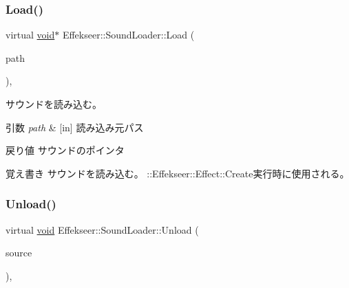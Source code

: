 \subsubsection{\texorpdfstring{Load()}{Load()}}
{\footnotesize\ttfamily virtual \mbox{\hyperlink{namespace_effekseer_ab34c4088e512200cf4c2716f168deb56}{void}}$\ast$ Effekseer\+::\+Sound\+Loader\+::\+Load (\begin{DoxyParamCaption}\item[{const \mbox{\hyperlink{_effekseer_8h_a50b026abea014b47854bcd835b3b6233}{E\+F\+K\+\_\+\+C\+H\+AR}} $\ast$}]{path }\end{DoxyParamCaption})\hspace{0.3cm}{\ttfamily [inline]}, {\ttfamily [virtual]}}



サウンドを読み込む。 


\begin{DoxyParams}{引数}
{\em path} & \mbox{[}in\mbox{]} 読み込み元パス \\
\hline
\end{DoxyParams}
\begin{DoxyReturn}{戻り値}
サウンドのポインタ 
\end{DoxyReturn}
\begin{DoxyNote}{覚え書き}
サウンドを読み込む。 \+::\+Effekseer\+::\+Effect\+::\+Create実行時に使用される。 
\end{DoxyNote}
\mbox{\label{class_effekseer_1_1_sound_loader_aa0b0fda4cbd0f9a6b9bf1babaef93679}} 
\subsubsection{\texorpdfstring{Unload()}{Unload()}}
{\footnotesize\ttfamily virtual \mbox{\hyperlink{namespace_effekseer_ab34c4088e512200cf4c2716f168deb56}{void}} Effekseer\+::\+Sound\+Loader\+::\+Unload (\begin{DoxyParamCaption}\item[{\mbox{\hyperlink{namespace_effekseer_ab34c4088e512200cf4c2716f168deb56}{void}} $\ast$}]{source }\end{DoxyParamCaption})\hspace{0.3cm}{\ttfamily [inline]}, {\ttfamily [virtual]}}



